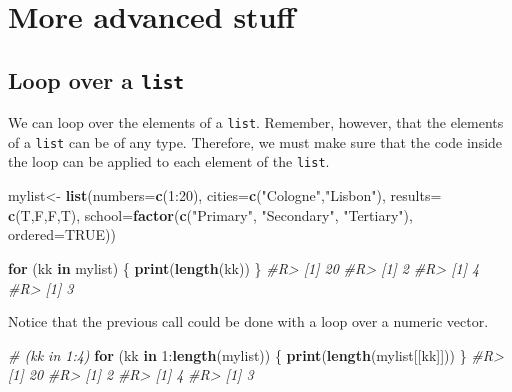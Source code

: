 \documentclass[]{book}
\newenvironment{Shaded}{}{}
\newcommand{\CommentTok}[1]{\textcolor[rgb]{0.38,0.63,0.69}{\textit{#1}}}
\newcommand{\ControlFlowTok}[1]{\textcolor[rgb]{0.00,0.44,0.13}{\textbf{#1}}}
\newcommand{\DataTypeTok}[1]{\textcolor[rgb]{0.56,0.13,0.00}{#1}}
\newcommand{\DecValTok}[1]{\textcolor[rgb]{0.25,0.63,0.44}{#1}}
\newcommand{\KeywordTok}[1]{\textcolor[rgb]{0.00,0.44,0.13}{\textbf{#1}}}
\newcommand{\NormalTok}[1]{#1}
\newcommand{\OperatorTok}[1]{\textcolor[rgb]{0.40,0.40,0.40}{#1}}
\newcommand{\OtherTok}[1]{\textcolor[rgb]{0.00,0.44,0.13}{#1}}
\newcommand{\StringTok}[1]{\textcolor[rgb]{0.25,0.44,0.63}{#1}}
\theoremstyle{definition}
\theoremstyle{definition}
\theoremstyle{definition}
\theoremstyle{remark}
\begin{document}
\hypertarget{more-advanced-stuff-1}{%
\section{More advanced stuff}\label{more-advanced-stuff-1}}

\hypertarget{loop-over-a-list}{%
\subsection{\texorpdfstring{Loop over a
\texttt{list}}{Loop over a list}}\label{loop-over-a-list}}

We can loop over the elements of a \texttt{list}. Remember, however,
that the elements of a \texttt{list} can be of any type. Therefore, we
must make sure that the code inside the loop can be applied to each
element of the \texttt{list}.

\begin{Shaded}
\begin{Highlighting}[]
\NormalTok{mylist<-}\StringTok{ }\KeywordTok{list}\NormalTok{(}\DataTypeTok{numbers=}\KeywordTok{c}\NormalTok{(}\DecValTok{1}\OperatorTok{:}\DecValTok{20}\NormalTok{), }
              \DataTypeTok{cities=}\KeywordTok{c}\NormalTok{(}\StringTok{"Cologne"}\NormalTok{,}\StringTok{"Lisbon"}\NormalTok{), }
              \DataTypeTok{results=} \KeywordTok{c}\NormalTok{(T,F,F,T), }
              \DataTypeTok{school=}\KeywordTok{factor}\NormalTok{(}\KeywordTok{c}\NormalTok{(}\StringTok{"Primary"}\NormalTok{, }\StringTok{"Secondary"}\NormalTok{, }\StringTok{"Tertiary"}\NormalTok{), }\DataTypeTok{ordered=}\OtherTok{TRUE}\NormalTok{))}

\ControlFlowTok{for}\NormalTok{ (kk }\ControlFlowTok{in}\NormalTok{ mylist) \{}
  \KeywordTok{print}\NormalTok{(}\KeywordTok{length}\NormalTok{(kk))}
\NormalTok{\}}
\CommentTok{#R> [1] 20}
\CommentTok{#R> [1] 2}
\CommentTok{#R> [1] 4}
\CommentTok{#R> [1] 3}
\end{Highlighting}
\end{Shaded}

Notice that the previous call could be done with a loop over a numeric
vector.

\begin{Shaded}
\begin{Highlighting}[]
\CommentTok{# (kk in 1:4)}
\ControlFlowTok{for}\NormalTok{ (kk }\ControlFlowTok{in} \DecValTok{1}\OperatorTok{:}\KeywordTok{length}\NormalTok{(mylist)) \{ }
  \KeywordTok{print}\NormalTok{(}\KeywordTok{length}\NormalTok{(mylist[[kk]]))}
\NormalTok{\}}
\CommentTok{#R> [1] 20}
\CommentTok{#R> [1] 2}
\CommentTok{#R> [1] 4}
\CommentTok{#R> [1] 3}
\end{Highlighting}
\end{Shaded}
\end{document}
